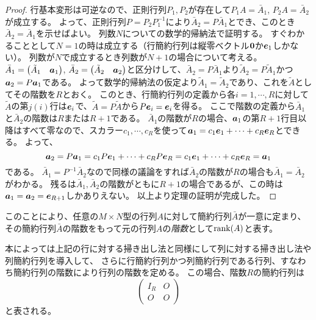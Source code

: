 \begin{proof}
行基本変形は可逆なので、正則行列$P_1, P_2$が存在して$P_1 A = \bar{A}_1$, $P_2 A = \bar{A}_2$が成立する。
よって、正則行列$P = P_2 P_1^{-1}$により$\bar{A}_2 = P\bar{A}_1$とでき、このとき$\bar{A}_2 = \bar{A}_1$を示せばよい。
列数$N$についての数学的帰納法で証明する。
すぐわかることとして$N = 1$の時は成立する（行簡約行列は縦零ベクトル$\vb*{0}$か$\vb*{e}_1$しかない）。
列数が$N$で成立するとき列数が$N+1$の場合について考える。
$\bar{A}_1 = \begin{pmatrix}\tilde{A}_1 & \vb*{a}_1\end{pmatrix}$, $\bar{A}_2 = \begin{pmatrix}\tilde{A}_2 & \vb*{a}_2\end{pmatrix}$と区分けして、$\bar{A}_2 = P\bar{A}_1$より$\tilde{A}_2 = P\tilde{A}_1$かつ$\vb*{a}_2 = P\vb*{a}_1$である。
よって数学的帰納法の仮定より$\tilde{A}_1 = \tilde{A}_2$であり、これを$\tilde{A}$としてその階数を$R$とおく。
このとき、行簡約行列の定義から各$i = 1, \cdots, R$に対して$\tilde{A}$の第$j(i)$行は$\vb*{e}_i$で、$\tilde{A} = P\tilde{A}$から$P\vb*{e}_i = \vb*{e}_i$を得る。
ここで階数の定義から$\bar{A}_1$と$\bar{A}_2$の階数は$R$または$R+1$である。
$\bar{A}_1$の階数が$R$の場合、$\vb*{a}_1$の第$R+1$行目以降はすべて零なので、スカラー$c_1, \cdots, c_R$を使って$\vb*{a}_1 = c_1\vb*{e}_1+\cdots+c_R\vb*{e}_R$とできる。
よって、
$$
\vb*{a}_2 = P\vb*{a}_1 = c_1 P\vb*{e}_1+\cdots+c_R P\vb*{e}_R = c_1\vb*{e}_1+\cdots+c_R\vb*{e}_R = \vb*{a}_1
$$
である。
$\bar{A}_1 = P^{-1}\bar{A}_2$なので同様の議論をすれば$\bar{A}_2$の階数が$R$の場合も$\bar{A}_1 = \bar{A}_2$がわかる。
残るは$\bar{A}_1, \bar{A}_2$の階数がともに$R+1$の場合であるが、この時は$\vb*{a}_1 = \vb*{a}_2 = \vb*{e}_{R+1}$しかありえない。
以上より定理の証明が完成した。
\end{proof}

このことにより、任意の$M\times N$型の行列$A$に対して簡約行列$\bar{A}$が一意に定まり、
その簡約行列$\bar{A}$の階数をもって元の行列$A$の\emph{階数}として$\rank(A)$と表す。

\begin{remark}
本によっては上記の行に対する掃き出し法と同様にして列に対する掃き出し法や列簡約行列を導入して、
さらに行簡約行列かつ列簡約行列である行列、すなわち簡約行列の階数により行列の階数を定める。
この場合、階数$R$の簡約行列は
$$
\begin{pmatrix}I_R & O \\ O & O\end{pmatrix}
$$
と表される。
\end{remark}

